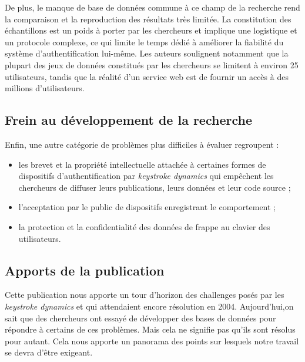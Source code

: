 De plus, le manque de base de données commune à ce champ de la recherche rend la comparaison et la reproduction des résultats très limitée. La constitution des échantillons est un poids à porter par les chercheurs et implique une logistique et un protocole complexe, ce qui limite le temps dédié à améliorer la fiabilité du système d'authentification lui-même. Les auteurs soulignent notamment que la plupart des jeux de données constitués par les chercheurs se limitent à environ 25 utilisateurs, tandis que la réalité d'un service web est de fournir un accès à des millions d'utilisateurs.

\subsection{Frein au développement de la recherche}
Enfin, une autre catégorie de problèmes plus difficiles à évaluer regroupent :

\begin{itemize}
	\item les brevet et la propriété intellectuelle attachée à certaines formes de dispositifs d'authentification par \textit{keystroke dynamics} qui empêchent les chercheurs de diffuser leurs publications, leurs données et leur code source ;
	\item l'acceptation par le public de dispositifs enregistrant le comportement ;
	\item la protection et la confidentialité des données de frappe au clavier des utilisateurs.
\end{itemize}

\subsection{Apports de la publication}
Cette publication nous apporte un tour d'horizon des challenges posés par les \textit {keystroke dynamics} et qui attendaient encore résolution en 2004. Aujourd'hui,on sait que des chercheurs ont essayé de développer des bases de données pour répondre à certains de ces problèmes. Mais cela ne signifie pas qu'ils sont résolus pour autant. Cela nous apporte un panorama des points sur lesquels notre travail se devra d'être exigeant.
